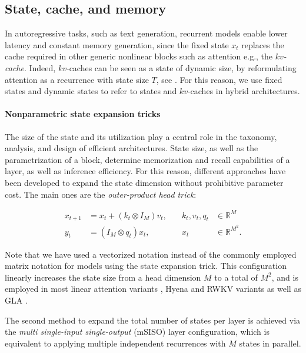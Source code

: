 \subsection{State, cache, and memory}\label{taxonomy}

In autoregressive tasks, such as text generation, recurrent models enable lower latency and constant memory generation, since the fixed state $x_t$  replaces the cache required in other generic nonlinear blocks such as attention e.g., the \textit{$kv$-cache}. Indeed, $kv$-caches can be seen as a state of dynamic size, by reformulating attention as a recurrence with state size $T$, see \cite{massaroli2023laughing}. For this reason, we use fixed states and dynamic states to refer to states and $kv$-caches in hybrid architectures.

\paragraph{Nonparametric state expansion tricks}

The size of the state and its utilization play a central role in the taxonomy, analysis, and design of efficient architectures. State size, as well as the parametrization of a block, determine memorization and recall capabilities of a layer, as well as inference efficiency. For this reason, different approaches have been developed to expand the state dimension without prohibitive parameter cost. The main ones are the \textit{outer-product head trick}: 

\[

\begin{aligned}   
    x_{t+1} &= x_{t} + (k_{t} \otimes I_M) v_t,\quad &k_t, v_t, q_t &\in \mathbb{R}^M \\ 
    y_{t} &= (I_M \otimes q_t) x_{t},\quad &x_t &\in \mathbb{R}^{M^2}.
\end{aligned}

\]

Note that we have used a vectorized notation instead of the commonly employed matrix notation for models using the state expansion trick. This configuration linearly increases the state size from a head dimension $M$ to a total of $M^2$, and is employed in most linear attention variants \cite{katharopoulos2020transformers}, Hyena and RWKV variants \cite{massaroli2023laughing,peng2023rwkv} as well as GLA \cite{yang2023gated}. 

The second method to expand the total number of states per layer is achieved via the \textit{multi single-input single-output} (mSISO) layer configuration, which is equivalent to applying multiple independent recurrences with $M$ states in parallel.

